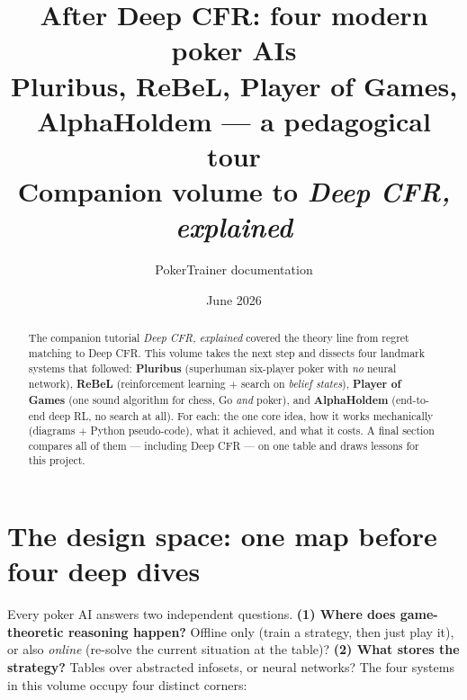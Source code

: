 \documentclass[11pt,a4paper]{article}
\title{\bfseries After Deep CFR: four modern poker AIs\\[2mm]
\large Pluribus, ReBeL, Player of Games, AlphaHoldem --- a pedagogical tour\\[1mm]
\normalsize Companion volume to \emph{Deep CFR, explained}}
\author{PokerTrainer documentation}
\date{June 2026}
\begin{document}
\maketitle

\begin{abstract}
The companion tutorial \emph{Deep CFR, explained} covered the theory line from
regret matching to Deep CFR. This volume takes the next step and dissects four
landmark systems that followed: \textbf{Pluribus} (superhuman six-player poker
with \emph{no} neural network), \textbf{ReBeL} (reinforcement learning $+$
search on \emph{belief states}), \textbf{Player of Games} (one sound algorithm
for chess, Go \emph{and} poker), and \textbf{AlphaHoldem} (end-to-end deep RL,
no search at all). For each: the one core idea, how it works mechanically
(diagrams $+$ Python pseudo-code), what it achieved, and what it costs.
A final section compares all of them --- including Deep CFR --- on one table and
draws lessons for this project.
\end{abstract}

\tableofcontents
\newpage

\section{The design space: one map before four deep dives}

Every poker AI answers two independent questions. \textbf{(1) Where does
game-theoretic reasoning happen?} Offline only (train a strategy, then just
play it), or also \emph{online} (re-solve the current situation at the table)?
\textbf{(2) What stores the strategy?} Tables over abstracted infosets, or
neural networks? The four systems in this volume occupy four distinct corners:
\end{document}
